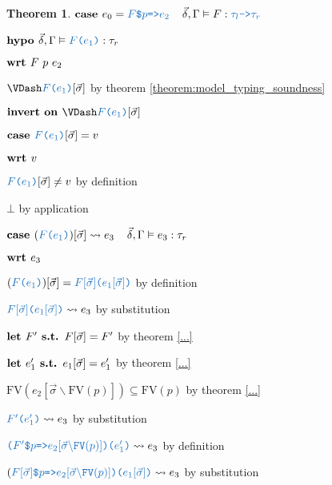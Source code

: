 \documentclass[acmsmall]{acmart}
\theoremstyle{definition}
\newtheorem{theorem}{Theorem}[section]
\begin{document}
\begin{theorem}
    \item \Z $\B{case }
      e_0 = \obj{$F$\$$p$=>$e_2$}
      \I
      \vec{\delta}, \Gamma \satisfies F \hastype \obj{$\tau_l$->$\tau_r$}
    $ 
    \item \Z $\B{hypo }
      \vec{\delta}, \Gamma \satisfies \obj{$F$($e_1$)} \hastype \tau_r
    $
    \item \Z $\textbf{wrt }
      F\ p\ e_2 
    $
      \item \Z\Z $\VDash \obj{$F$($e_1$)}[\vec{\sigma}] $
      by theorem \ref{theorem:model_typing_soundness}
      \item \Z\Z $\B{invert on } \VDash \obj{$F$($e_1$)}[\vec{\sigma}]$
      \item \Z\Z $\B{case } \obj{$F$($e_1$)}[\vec{\sigma}] = v$
      \item \Z\Z $\textbf{wrt } v$
        \item \Z\Z\Z $\obj{$F$($e_1$)}[\vec{\sigma}] \neq v$ by definition 
        \item \Z\Z\Z $\bot$ by application
      \item \Z\Z $\B{case } 
        (\obj{$F$($e_1$)})[\vec{\sigma}] \rightsquigarrow e_3
        \I
        \vec{\delta}, \Gamma \satisfies e_3 \hastype \tau_r
      $
      \item \Z\Z $\textbf{wrt } e_3$
        \item \Z\Z\Z $(\obj{$F$($e_1$)})[\vec{\sigma}] = \obj{$F[\vec{\sigma}]$($e_1[\vec{\sigma}]$)}$ by definition
        \item \Z\Z\Z $\obj{$F[\vec{\sigma}]$($e_1[\vec{\sigma}]$)} \rightsquigarrow e_3$ by substitution 

        \item \Z\Z\Z $\textbf{let } F' \textbf{ s.t. } F[\vec{\sigma}] = F'$ by theorem \ref{...} 
        \item \Z\Z\Z $\textbf{let } e_1' \textbf{ s.t. } e_1[\vec{\sigma}] = e_1'$ by theorem \ref{...} 

        \item \Z\Z\Z $\text{FV}(e_2[\vec{\sigma}\backslash\text{FV}(p)]) \subseteq \text{FV}(p)$ 
        by theorem \ref{...} 

        \item \Z\Z\Z $\obj{$F'$($e_1'$)} \rightsquigarrow e_3$ by substitution 
        \item \Z\Z\Z $\obj{($F'$\$$p$=>$e_2[\vec{\sigma}\backslash\text{FV}(p)]$)($e_1'$)} \rightsquigarrow e_3$ by definition 
        \item \Z\Z\Z $(\obj{$F[\vec{\sigma}]$\$$p$=>$e_2[\vec{\sigma}\backslash\text{FV}(p)]$)($e_1[\vec{\sigma}]$)} \rightsquigarrow e_3$ by substitution 


\end{theorem}
\end{document}
